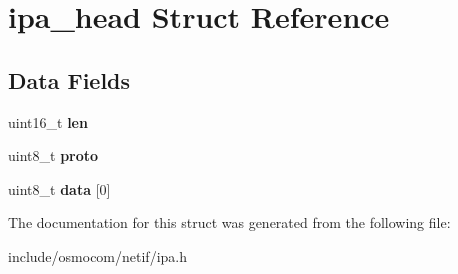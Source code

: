 \section{ipa\+\_\+head Struct Reference}
\label{structipa__head}
\subsection*{Data Fields}
\begin{DoxyCompactItemize}
\item 
uint16\+\_\+t {\bfseries len}\label{structipa__head_a9bbcada25e9b0877527f6cb0a643aa0c}

\item 
uint8\+\_\+t {\bfseries proto}\label{structipa__head_af9d1353ce62c64cb88070fe9dae29906}

\item 
uint8\+\_\+t {\bfseries data} [0]\label{structipa__head_a4a4616c284c8fdb6598ee46fb616ae90}

\end{DoxyCompactItemize}


The documentation for this struct was generated from the following file\+:\begin{DoxyCompactItemize}
\item 
include/osmocom/netif/ipa.\+h\end{DoxyCompactItemize}
